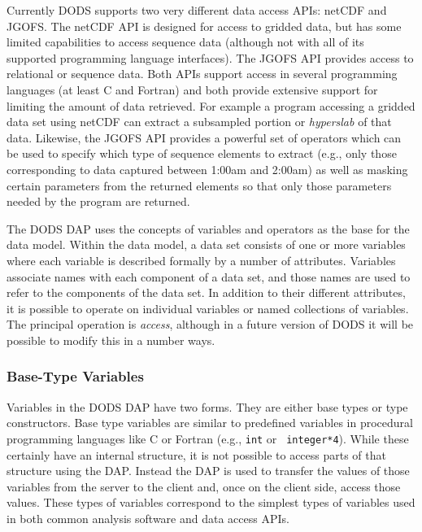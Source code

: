 Currently DODS supports two very different data access APIs: netCDF and
JGOFS\cite{JGOFS:url}. The netCDF API is designed for access to gridded data,
but has some limited capabilities to access sequence data (although not with
all of its supported programming language interfaces). The JGOFS API provides
access to relational or sequence data.  Both APIs support access in several
programming languages (at least C and Fortran) and both provide extensive
support for limiting the amount of data retrieved.  For example a program
accessing a gridded data set using netCDF can extract a subsampled portion or
{\em hyperslab} of that data\cite{rew:netcdf}. Likewise, the JGOFS API
provides a powerful set of operators which can be used to specify which type
of sequence elements to extract (e.g., only those corresponding to data
captured between 1:00am and 2:00am) as well as masking certain parameters
from the returned elements so that only those parameters needed by the
program are returned.

The DODS DAP uses the concepts of variables and operators as the base for the
data model. Within the data model, a data set consists of one or more
variables where each variable is described formally by a number of
attributes.  Variables associate names with each component of a data set, and
those names are used to refer to the components of the data set. In addition
to their different attributes, it is possible to operate on individual
variables or named collections of variables. The principal operation is {\em
access}, although in a future version of DODS it will be possible to modify
this in a number ways.

\subsubsection{Base-Type Variables}
\label{base-type-variables}

Variables in the DODS DAP have two forms. They are either base types or type
constructors. Base type variables are similar to predefined variables in
procedural programming languages like C or Fortran (e.g., {\tt int} or {\tt
  integer*4}).  While these certainly have an internal structure, it is not
possible to access parts of that structure using the DAP\@. Instead the DAP
is used to transfer the values of those variables from the server to the
client and, once on the client side, access those values. These types of
variables correspond to the simplest types of variables used in both common
analysis software and data access APIs\cite{treinish:models}.

